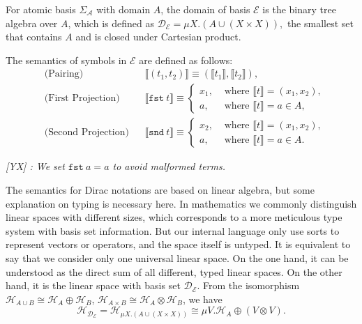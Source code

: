 \documentclass[manuscript, review, timestamp]{acmart}
\newcommand{\yx}[1]{\textit{\color{blue}[YX] : #1}}
\newcommand*{\fst}{\texttt{fst}}
\newcommand*{\snd}{\texttt{snd}}
\newcommand*{\sem}[1]{\llbracket #1 \rrbracket}
\begin{document}
\begin{definition}
  For atomic basis $\Sigma_\mathcal{A}$ with domain $A$, the domain of basis $\mathcal{E}$ is the binary tree algebra over $A$, which is defined as 
  $
  \mathcal{D}_\mathcal{E} = \mu X.(A\cup (X \times X)),
  $
  the smallest set that contains $A$ and is closed under Cartesian product.

  The semantics of symbols in $\mathcal{E}$ are defined as follows:
  \begin{align*}
    & \text{(Pairing)} &&
    \sem{(t_1, t_2)} \equiv (\sem{t_1}, \sem{t_2}), \\
    & \text{(First Projection)} &&
    \sem{\fst\ t} \equiv \left\{
      \begin{array}{ll}
        x_1, & \text{ where } \sem{t} = (x_1, x_2), \\
        a, & \text{ where } \sem{t} = a \in A,
      \end{array}
      \right. \\
    & \text{(Second Projection)} &&
    \sem{\snd\ t} \equiv \left\{
      \begin{array}{ll}
        x_2, & \text{ where } \sem{t} = (x_1, x_2), \\
        a, & \text{ where } \sem{t} = a \in A.
      \end{array}
      \right.
  \end{align*}
\end{definition}

\yx{We set $\fst\ a = a$ to avoid malformed terms.}


The semantics for Dirac notations are based on linear algebra, but some explanation on typing is necessary here. In mathematics we commonly distinguish linear spaces with different sizes, which corresponds to a more meticulous type system with basis set information. But our internal language only use sorts to represent vectors or operators, and the space itself is untyped. It is equivalent to say that we consider only one universal linear space. On the one hand, it can be understood as the direct sum of all different, typed linear spaces. On the other hand, it is the linear space with basis set $\mathcal{D}_\mathcal{E}$. From the isomorphism $\mathcal{H}_{A\cup B} \cong \mathcal{H}_A \oplus \mathcal{H}_B$, $\mathcal{H}_{A \times B} \cong \mathcal{H}_A \otimes \mathcal{H}_B$, we have
$$
\mathcal{H}_{\mathcal{D}_\mathcal{E}} = \mathcal{H}_{\mu X.(A\cup (X \times X))} \cong \mu V. \mathcal{H}_A \oplus (V \otimes V).
$$
\end{document}
